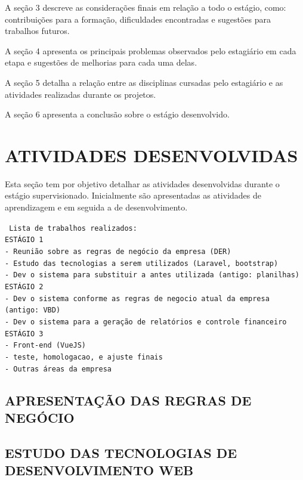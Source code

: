 \documentclass[
  12pt,				%
  openany,
  oneside,
  a4paper,			%
  english,			%
  brazil
]{article}
\numberwithin{figure}{section}
\numberwithin{table}{section}
\begin{document}
A seção 3 descreve as considerações finais em relação a todo o estágio, como: contribuições para a formação, dificuldades encontradas e sugestões para trabalhos futuros.

A seção 4 apresenta os principais problemas observados pelo estagiário em cada etapa e sugestões de melhorias para cada uma delas.

A seção 5 detalha a relação entre as disciplinas cursadas pelo estagiário e as atividades realizadas durante os projetos.

A seção 6 apresenta a conclusão sobre o estágio desenvolvido.






\section{ATIVIDADES DESENVOLVIDAS}


Esta seção tem por objetivo detalhar as atividades desenvolvidas durante o estágio supervisionado. Inicialmente são apresentadas as atividades de aprendizagem e em seguida a de desenvolvimento.


\noindent \texttt{
  Lista de trabalhos realizados:\\
  ESTÁGIO 1 \\
  - Reunião sobre as regras de negócio da empresa (DER) \\
  - Estudo das tecnologias a serem utilizados (Laravel, bootstrap) \\
  - Dev o sistema para substituir a antes utilizada (antigo: planilhas) \\
  ESTÁGIO 2 \\
  - Dev o sistema conforme as regras de negocio atual da empresa (antigo: VBD) \\
  - Dev o sistema para a geração de relatórios e controle financeiro \\
  ESTÁGIO 3 \\
  - Front-end (VueJS) \\
  - teste, homologacao, e ajuste finais \\
  - Outras áreas da empresa
}


\subsection{APRESENTAÇÃO DAS REGRAS DE NEGÓCIO}

\subsection{ESTUDO DAS TECNOLOGIAS DE DESENVOLVIMENTO WEB}
\end{document}

